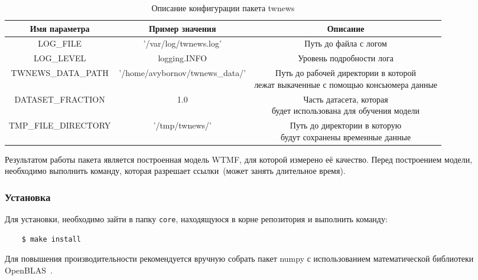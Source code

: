         \begin{table}[h!]
            \small
            \caption{Описание конфигурации пакета twnews\bigskip}
            \centering

            \begin{sideways}
            \label{tabular:core_config}
            \begin{tabular}{|c|c|c|}
                \hline
                \bf{Имя параметра} & \bf{Пример значения} & \bf{Описание} \\ \hline
                LOG\_FILE & '/var/log/twnews.log' & Путь до файла с логом \\ \hline
                LOG\_LEVEL & logging.INFO & Уровень подробности лога \\ \hline
                TWNEWS\_DATA\_PATH & '/home/avybornov/twnews\_data/' & \specialcell{Путь до рабочей директории в которой \\ лежат выкаченные с помощью консьюмера данные} \\ \hline
                DATASET\_FRACTION & 1.0 & \specialcell{Часть датасета, которая  \\ будет использована для обучения модели } \\ \hline
                TMP\_FILE\_DIRECTORY & '/tmp/twnews/' & \specialcell{Путь до директории в которую \\ будут сохранены временные данные} \\ \hline
            \end{tabular}
        \end{sideways}
        \end{table}

        Результатом работы пакета является построенная модель WTMF, для которой измерено её качество. Перед построением модели, необходимо выполнить команду, которая разрешает ссылки~(может занять длительное время).

        \subsubsection{Установка}
            Для установки, необходимо зайти в папку \lstinline{core}, находящуюся в корне репозитория и выполнить команду:

            \begin{lstlisting}
    $ make install
            \end{lstlisting}

            Для повышения производительности рекомендуется вручную собрать пакет numpy с использованием математической библиотеки OpenBLAS~\cite{blas_installation}.

